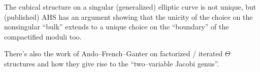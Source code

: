 The cubical structure on a singular (generalized) elliptic curve is not unique, but (published) AHS has an argument showing that the unicity of the choice on the nonsingular ``bulk'' extends to a unique choice on the ``boundary'' of the compactified moduli too.


There's also the work of Ando--French--Ganter on factorized / iterated $\Theta$ structures and how they give rise to the ``two--variable Jacobi genus''.












